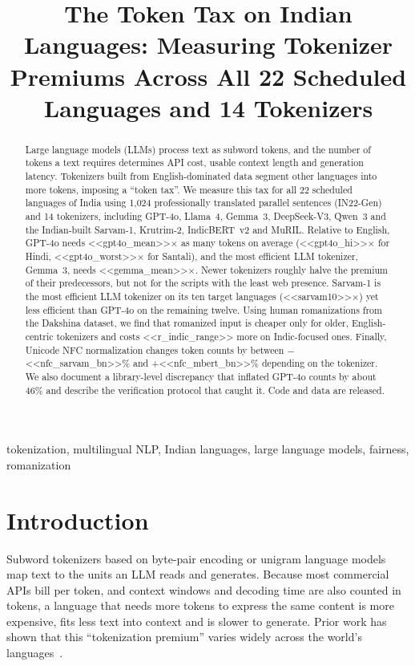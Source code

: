 \documentclass[conference]{IEEEtran}
\begin{document}
\title{The Token Tax on Indian Languages: Measuring Tokenizer Premiums Across All 22 Scheduled Languages and 14 Tokenizers}

\author{
}

\maketitle

\begin{abstract}
Large language models (LLMs) process text as subword tokens, and the number of tokens a text requires determines API cost, usable context length and generation latency. Tokenizers built from English-dominated data segment other languages into more tokens, imposing a ``token tax''. We measure this tax for all 22 scheduled languages of India using 1,024 professionally translated parallel sentences (IN22-Gen) and 14 tokenizers, including GPT-4o, Llama~4, Gemma~3, DeepSeek-V3, Qwen~3 and the Indian-built Sarvam-1, Krutrim-2, IndicBERT~v2 and MuRIL. Relative to English, GPT-4o needs <<gpt4o_mean>>$\times$ as many tokens on average (<<gpt4o_hi>>$\times$ for Hindi, <<gpt4o_worst>>$\times$ for Santali), and the most efficient LLM tokenizer, Gemma~3, needs <<gemma_mean>>$\times$. Newer tokenizers roughly halve the premium of their predecessors, but not for the scripts with the least web presence. Sarvam-1 is the most efficient LLM tokenizer on its ten target languages (<<sarvam10>>$\times$) yet less efficient than GPT-4o on the remaining twelve. Using human romanizations from the Dakshina dataset, we find that romanized input is cheaper only for older, English-centric tokenizers and costs <<r_indic_range>> more on Indic-focused ones. Finally, Unicode NFC normalization changes token counts by between $-$<<nfc_sarvam_bn>>\% and +<<nfc_mbert_bn>>\% depending on the tokenizer. We also document a library-level discrepancy that inflated GPT-4o counts by about 46\% and describe the verification protocol that caught it. Code and data are released.
\end{abstract}

\begin{IEEEkeywords}
tokenization, multilingual NLP, Indian languages, large language models, fairness, romanization
\end{IEEEkeywords}

\section{Introduction}
Subword tokenizers based on byte-pair encoding or unigram language models~\cite{sennrich2016,kudo2018} map text to the units an LLM reads and generates. Because most commercial APIs bill per token, and context windows and decoding time are also counted in tokens, a language that needs more tokens to express the same content is more expensive, fits less text into context and is slower to generate. Prior work has shown that this ``tokenization premium'' varies widely across the world's languages~\cite{petrov2023,ahia2023}.
\end{document}
